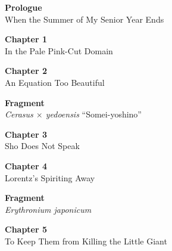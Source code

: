 \documentclass[
    a4paper,
    12pt,
    twoside,
    openany,
    UTF8,
    fontset=windows
]{ctexbook}
\begin{document}
\hspace*{\fill}
\begin{minipage}{0.85\textwidth}
    \begin{flushright}
    \end{flushright}

    \vspace{0.8cm}

    \begin{flushleft}
    \small
    \begin{list}{}{
        \setlength{\leftmargin}{0pt}
        \setlength{\labelwidth}{0pt}
        \setlength{\itemindent}{0pt}
        \setlength{\parsep}{0.3ex}   %
        \setlength{\topsep}{0pt}
        \setlength{\itemsep}{0pt}
    }
        \item \textbf{Prologue} \dotfill \pageref{sec:prologue} \\
        When the Summer of My Senior Year Ends

        \item \textbf{Chapter 1} \dotfill \pageref{sec:ch1} \\
        In the Pale Pink-Cut Domain

        \item \textbf{Chapter 2} \dotfill \pageref{sec:ch2} \\
        An Equation Too Beautiful

        \item \textbf{Fragment} \dotfill \pageref{sec:fragment1} \\
        \textit{Cerasus $\times$ yedoensis} ``Somei-yoshino''

        \item \textbf{Chapter 3} \dotfill \pageref{sec:ch3} \\
        Sho Does Not Speak

        \item \textbf{Chapter 4} \dotfill \pageref{sec:ch4} \\
        Lorentz's Spiriting Away

        \item \textbf{Fragment} \dotfill \pageref{sec:fragment2} \\
        \textit{Erythronium japonicum}

        \item \textbf{Chapter 5} \dotfill \pageref{sec:ch5} \\
        To Keep Them from Killing the Little Giant


\end{list}
\end{flushleft}
\end{minipage}
\end{document}
